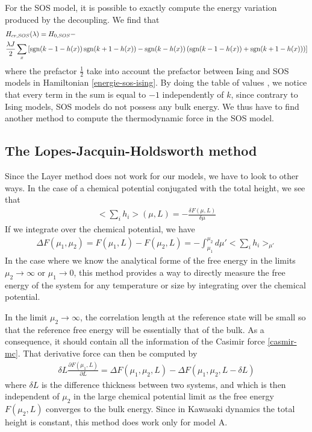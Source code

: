 For the SOS model, it is possible to exactly compute the energy variation produced by the decoupling. We find that
\begin{align}
&H_{cr,SOS}(\lambda) = H_{0,SOS} - \nonumber \\
&\frac{\lambda J}{2} \sum_x \left[ \operatorname{sgn}(k-1-h(x)) \operatorname{sgn}(k+1-h(x)) - \operatorname{sgn}(k-h(x)) \left( \operatorname{sgn}(k-1-h(x))+\operatorname{sgn}(k+1-h(x)) \right) \right]
\end{align}
where the prefactor $\frac{1}{2}$ take into account the prefactor between Ising and SOS models in Hamiltonian \eqref{energie-sos-ising}. By doing the table of values , we notice that every term in the sum is equal to $-1$ independently of $k$, since contrary to Ising models, SOS models do not possess any bulk energy. We thus have to find another method to compute the thermodynamic force in the SOS model.

\subsection{The Lopes-Jacquin-Holdsworth method}
    \label{sec-lopes}
Since the Layer method does not work for our models, we have to look to other ways. In the case of a chemical potential conjugated with the total height, we see that \cite{lopes_cardozo_critical_2014}
\begin{align}
<\sum_i h_i>(\mu,L) = - \frac{\delta F(\mu,L)}{\delta \mu}
\end{align} 
If we integrate over the chemical potential, we have
\begin{align}
\Delta F(\mu_1,\mu_2) = F(\mu_1,L) - F(\mu_2,L) = - \int_{\mu_1}^{\mu_2} d\mu' <\sum_i h_i>_{\mu'}
\label{integration-cardozo}
\end{align}
In the case where we know the analytical forme of the free energy in the limits $\mu_2 \to \infty$ or $\mu_1 \to 0$, this method provides a way to directly measure the free energy of the system for any temperature or size by integrating over the chemical potential.

In the limit $\mu_2 \to \infty$, the correlation length at the reference state will be small so that the reference free energy will be essentially that of the bulk. As a consequence, it should contain all the information of the Casimir force \eqref{casmir-mc}. That derivative force can then be computed by 
\begin{align}
    \delta L \frac{\partial F(\mu_1,L)}{\partial L} = \Delta F(\mu_1,\mu_2,L)-\Delta F(\mu_1,\mu_2,L-\delta L)
    \label{cas-lopes}
\end{align}
where $\delta L$ is the difference thickness between two systems, and which is then independent of $\mu_2$ in the large chemical potential limit as the free energy $F(\mu_2,L)$ converges to the bulk energy.
Since in Kawasaki dynamics the total height is constant, this method does work only for model A.


